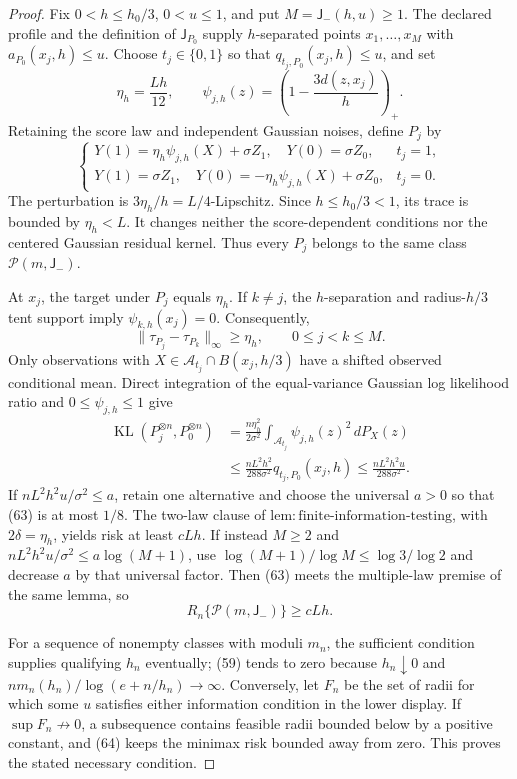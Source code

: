 \documentclass{article}
\begin{document}
\begin{proof}
Fix \(0<h\le h_0/3\), \(0<u\le1\), and put
\(M=\mathsf J_{-}(h,u)\ge1\).  The declared profile and the definition of
\(\mathsf J_{P_0}\) supply \(h\)-separated points
\(x_1,\ldots,x_M\) with \(a_{P_0}(x_j,h)\le u\).  Choose
\(t_j\in\{0,1\}\) so that \(q_{t_j,P_0}(x_j,h)\le u\), and set
\[
 \eta_h=\frac{Lh}{12},
 \qquad
 \psi_{j,h}(z)=\left(1-\frac{3d(z,x_j)}h\right)_+.
 \tag{60}
\]
Retaining the score law and independent Gaussian noises, define \(P_j\)
by
\[
 \begin{cases}
 Y(1)=\eta_h\psi_{j,h}(X)+\sigma Z_1,
 \quad Y(0)=\sigma Z_0,&t_j=1,\\
 Y(1)=\sigma Z_1,
 \quad Y(0)=-\eta_h\psi_{j,h}(X)+\sigma Z_0,&t_j=0.
 \end{cases}
 \tag{61}
\]
The perturbation is \(3\eta_h/h=L/4\)-Lipschitz.  Since
\(h\le h_0/3<1\), its trace is bounded by \(\eta_h<L\).  It changes
neither the score-dependent conditions nor the centered Gaussian
residual kernel.  Thus every \(P_j\) belongs to the same class
\(\mathcal P(m,\mathsf J_{-})\).

At \(x_j\), the target under \(P_j\) equals \(\eta_h\).  If \(k\ne j\),
the \(h\)-separation and radius-\(h/3\) tent support imply
\(\psi_{k,h}(x_j)=0\).  Consequently,
\[
 \|\tau_{P_j}-\tau_{P_k}\|_\infty\ge\eta_h,
 \qquad 0\le j<k\le M.
 \tag{62}
\]
Only observations with
\(X\in\mathcal A_{t_j}\cap B(x_j,h/3)\) have a shifted observed
conditional mean.  Direct integration of the equal-variance Gaussian
log likelihood ratio and \(0\le\psi_{j,h}\le1\) give
\[
 \begin{aligned}
 \operatorname{KL}(P_j^{\otimes n},P_0^{\otimes n})
 &=\frac{n\eta_h^2}{2\sigma^2}
   \int_{\mathcal A_{t_j}}\psi_{j,h}(z)^2\,dP_X(z)\\
 &\le\frac{nL^2h^2}{288\sigma^2}q_{t_j,P_0}(x_j,h)
 \le\frac{nL^2h^2u}{288\sigma^2}.
 \end{aligned}
 \tag{63}
\]
If \(nL^2h^2u/\sigma^2\le a\), retain one alternative and choose the
universal \(a>0\) so that (63) is at most \(1/8\).  The two-law clause of
\(\mathrm{lem:finite\text{-}information\text{-}testing}\), with
\(2\delta=\eta_h\), yields risk at least \(cLh\).  If instead \(M\ge2\)
and \(nL^2h^2u/\sigma^2\le a\log(M+1)\), use
\(\log(M+1)/\log M\le\log3/\log2\) and decrease \(a\) by that universal
factor.  Then (63) meets the multiple-law premise of the same lemma, so
\[
 R_n\{\mathcal P(m,\mathsf J_{-})\}\ge cLh.
 \tag{64}
\]

For a sequence of nonempty classes with moduli \(m_n\), the sufficient
condition supplies qualifying \(h_n\) eventually; (59) tends to zero
because \(h_n\downarrow0\) and
\(nm_n(h_n)/\log(e+n/h_n)\to\infty\).  Conversely, let \(F_n\) be the
set of radii for which some \(u\) satisfies either information condition
in the lower display.  If \(\sup F_n\not\to0\), a subsequence contains
feasible radii bounded below by a positive constant, and (64) keeps the
minimax risk bounded away from zero.  This proves the stated necessary
condition.


\end{proof}
\end{document}
